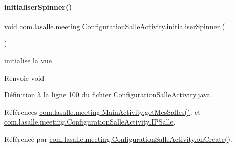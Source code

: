\paragraph{\texorpdfstring{initialiser\+Spinner()}{initialiserSpinner()}}
{\footnotesize\ttfamily void com.\+lasalle.\+meeting.\+Configuration\+Salle\+Activity.\+initialiser\+Spinner (\begin{DoxyParamCaption}{ }\end{DoxyParamCaption})}



initialise la vue 

\begin{DoxyReturn}{Renvoie}
void 
\end{DoxyReturn}


Définition à la ligne \hyperlink{_configuration_salle_activity_8java_source_l00100}{100} du fichier \hyperlink{_configuration_salle_activity_8java_source}{Configuration\+Salle\+Activity.\+java}.



Références \hyperlink{_main_activity_8java_source_l00470}{com.\+lasalle.\+meeting.\+Main\+Activity.\+get\+Mes\+Salles()}, et \hyperlink{_configuration_salle_activity_8java_source_l00042}{com.\+lasalle.\+meeting.\+Configuration\+Salle\+Activity.\+I\+P\+Salle}.



Référencé par \hyperlink{_configuration_salle_activity_8java_source_l00066}{com.\+lasalle.\+meeting.\+Configuration\+Salle\+Activity.\+on\+Create()}.


